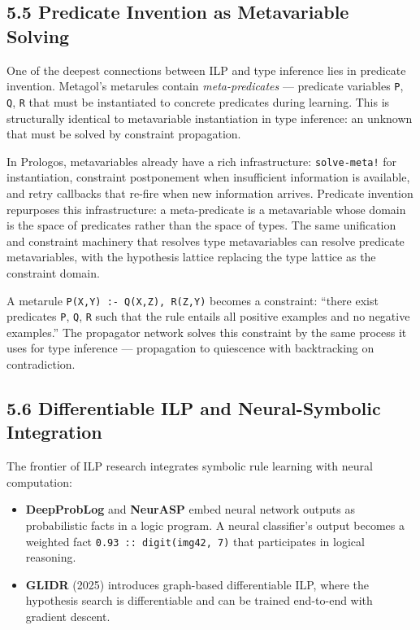 \documentclass[11pt]{article}
\begin{document}
\subsection{5.5 Predicate Invention as Metavariable Solving}
\label{sec:org10c42b2}

One of the deepest connections between ILP and type inference lies in
predicate invention. Metagol's metarules contain \emph{meta-predicates} ---
predicate variables \texttt{P}, \texttt{Q}, \texttt{R} that must be instantiated to
concrete predicates during learning. This is structurally identical to
metavariable instantiation in type inference: an unknown that must be
solved by constraint propagation.

In Prologos, metavariables already have a rich infrastructure:
\texttt{solve-meta!} for instantiation, constraint postponement when
insufficient information is available, and retry callbacks that
re-fire when new information arrives. Predicate invention repurposes
this infrastructure: a meta-predicate is a metavariable whose domain
is the space of predicates rather than the space of types. The same
unification and constraint machinery that resolves type metavariables
can resolve predicate metavariables, with the hypothesis lattice
replacing the type lattice as the constraint domain.

A metarule \texttt{P(X,Y) :- Q(X,Z), R(Z,Y)} becomes a constraint: ``there
exist predicates \texttt{P}, \texttt{Q}, \texttt{R} such that the rule entails all positive
examples and no negative examples.'' The propagator network solves
this constraint by the same process it uses for type inference ---
propagation to quiescence with backtracking on contradiction.
\subsection{5.6 Differentiable ILP and Neural-Symbolic Integration}
\label{sec:org7ed2c2b}

The frontier of ILP research integrates symbolic rule learning with
neural computation:

\begin{itemize}
\item \textbf{DeepProbLog} and \textbf{NeurASP} embed neural network outputs as
probabilistic facts in a logic program. A neural classifier's output
becomes a weighted fact \texttt{0.93 :: digit(img42, 7)} that participates
in logical reasoning.

\item \textbf{GLIDR} (2025) introduces graph-based differentiable ILP, where
the hypothesis search is differentiable and can be trained
end-to-end with gradient descent.
\end{itemize}
\end{document}
